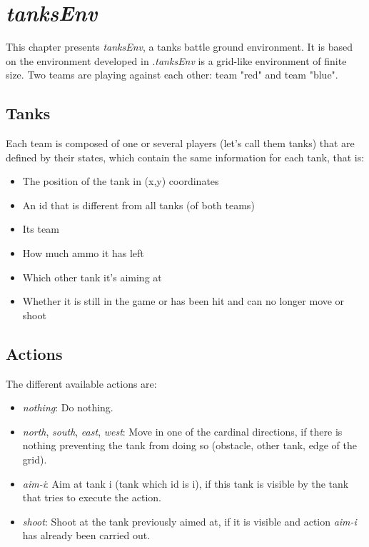 \chapter{\textit{tanksEnv}}

This chapter presents \textit{tanksEnv}, a tanks battle ground environment. It is based on the environment developed in \cite{boeckx}.\textit{tanksEnv} is a grid-like environment of finite size. Two teams are playing against each other: team "red" and team "blue". 

\section{Tanks} 

Each team is composed of one or several players (let's call them tanks) that are defined by their states, which contain the same information for each tank, that is:

\begin{itemize}
    \item The position of the tank in (x,y) coordinates
    \item An id that is different from all tanks (of both teams)
    \item Its team
    \item How much ammo it has left
    \item Which other tank it's aiming at
    \item Whether it is still in the game or has been hit and can no longer move or shoot
\end{itemize}

\section{Actions}

The different available actions are:

\begin{itemize}
    \item \textit{nothing}: Do nothing.
    \item \textit{north}, \textit{south}, \textit{east}, \textit{west}: Move in one of the cardinal directions, if there is nothing preventing the tank from doing so (obstacle, other tank, edge of the grid).
    \item \textit{aim-i}: Aim at tank i (tank which id is i), if this tank is visible by the tank that tries to execute the action.
    \item \textit{shoot}: Shoot at the tank previously aimed at, if it is visible and action \textit{aim-i} has already been carried out.
\end{itemize}
\hfill\break

